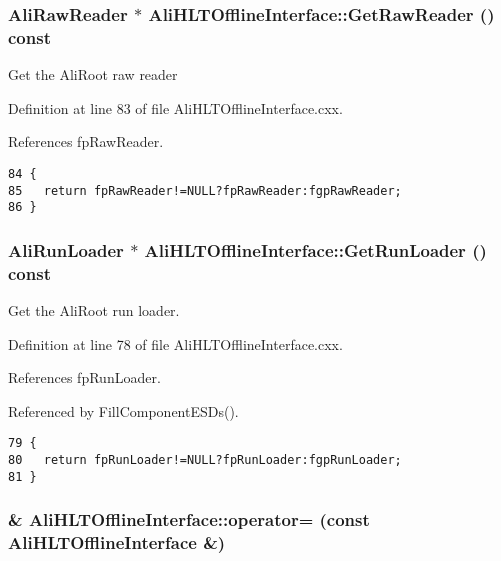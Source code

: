 \subsubsection{\setlength{\rightskip}{0pt plus 5cm}Ali\-Raw\-Reader $\ast$ Ali\-HLTOffline\-Interface::Get\-Raw\-Reader () const}\label{classAliHLTOfflineInterface_a6}


Get the Ali\-Root raw reader 

Definition at line 83 of file Ali\-HLTOffline\-Interface.cxx.

References fp\-Raw\-Reader.

\footnotesize\begin{verbatim}84 {
85   return fpRawReader!=NULL?fpRawReader:fgpRawReader;
86 }
\end{verbatim}\normalsize 


\subsubsection{\setlength{\rightskip}{0pt plus 5cm}Ali\-Run\-Loader $\ast$ Ali\-HLTOffline\-Interface::Get\-Run\-Loader () const}\label{classAliHLTOfflineInterface_a5}


Get the Ali\-Root run loader. 

Definition at line 78 of file Ali\-HLTOffline\-Interface.cxx.

References fp\-Run\-Loader.

Referenced by Fill\-Component\-ESDs().

\footnotesize\begin{verbatim}79 {
80   return fpRunLoader!=NULL?fpRunLoader:fgpRunLoader;
81 }
\end{verbatim}\normalsize 


\subsubsection{ \& Ali\-HLTOffline\-Interface::operator= (const {\bf Ali\-HLTOffline\-Interface} \&)}\label{classAliHLTOfflineInterface_a3}


